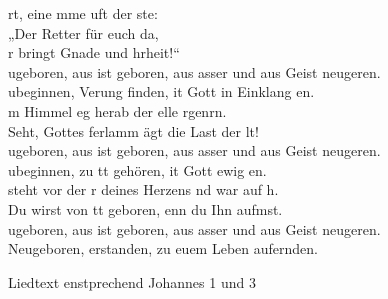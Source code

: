 rt, eine mme uft  der ste:\\
„Der Retter  für euch da,\\ 
r bringt Gnade und hrheit!“\\

ugeboren, aus ist geboren, aus asser und aus Geist neugeren.\\
ubeginnen, Verung finden, it Gott in Einklang en.\\

m Himmel eg herab der elle rgenrn.\\
Seht, Gottes ferlamm ägt die Last der lt!\\

ugeboren, aus ist geboren, aus asser und aus Geist neugeren.\\
ubeginnen, zu tt gehören, it Gott ewig en.\\

 steht vor der r deines Herzens nd war auf h.\\
Du wirst von tt geboren, enn du Ihn aufmst.\\

ugeboren, aus ist geboren, aus asser und aus Geist neugeren.\\
Neugeboren, erstanden, zu euem Leben aufernden.\\

\begin{footnotesize}
Liedtext enstprechend Johannes 1 und 3\\
\end{footnotesize}